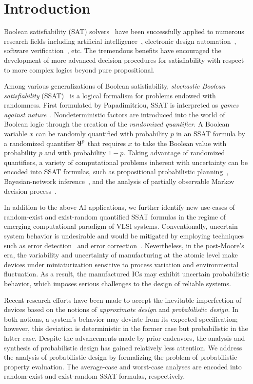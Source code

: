 \chapter{Introduction}
\label{chap:introduction}
Boolean satisfiability (SAT) solvers~\cite{SATHandbook} have been successfully applied to numerous research fields including artificial intelligence~\cite{Nilsson2014,Russell2020}, electronic design automation~\cite{Marques2000,Wang2009}, software verification~\cite{Jhala2009, Berard2013}, etc.
The tremendous benefits have encouraged the development of more advanced decision procedures for satisfiability with respect to more complex logics beyond pure propositional.

Among various generalizations of Boolean satisfiability, \textit{stochastic Boolean satisfiability} (SSAT)~\cite{SATHandbook-SSAT} is a logical formalism for problems endowed with randomness.
First formulated by Papadimitriou, SSAT is interpreted as \textit{games against nature}~\cite{Papadimitriou1985}.
Nondeterministic factors are introduced into the world of Boolean logic through the creation of the \textit{randomized quantifier}.
A Boolean variable $x$ can be randomly quantified with probability $p$ in an SSAT formula by a randomized quantifier $\random{p}$ that requires $x$ to take the Boolean value \true with probability $p$ and \false with probability $1-p$.
Taking advantage of randomized quantifiers, a variety of computational problems inherent with uncertainty can be encoded into SSAT formulas,
such as propositional probabilistic planning~\cite{Littman1998},
Bayesian-network inference~\cite{Cooper1990,Jensen1996,Bacchus2003},
and the analysis of partially observable Markov decision process~\cite{Majercik2003}.

In addition to the above AI applications,
we further identify new use-cases of random-exist and exist-random quantified SSAT formulas in the regime of emerging computational paradigm of VLSI systems.
Conventionally, uncertain system behavior is undesirable and would be mitigated by employing techniques such as error detection~\cite{Constantinescu2003} and error correction~\cite{Mitra2006}.
Nevertheless, in the post-Moore's era,
the variability and uncertainty of manufacturing at the atomic level make devices under miniaturization sensitive to process variation and environmental fluctuation.
As a result, the manufactured ICs may exhibit uncertain probabilistic behavior,
which imposes serious challenges to the design of reliable systems.

Recent research efforts have been made to accept the inevitable imperfection of devices based on the notions of \textit{approximate design} and \textit{probabilistic design}.
In both notions, a system's behavior may deviate from its expected specification;
however, this deviation is deterministic in the former case but probabilistic in the latter case.
Despite the advancements made by prior endeavors,
the analysis and synthesis of probabilistic design has gained relatively less attention.
We address the analysis of probabilistic design by formalizing the problem of probabilistic property evaluation.
The average-case and worst-case analyses are encoded into random-exist and exist-random SSAT formulas, respectively.

